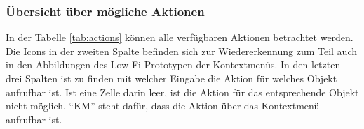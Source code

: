 \subsubsection*{Übersicht über mögliche Aktionen}

In der Tabelle \ref{tab:actions} können alle verfügbaren Aktionen betrachtet werden. Die Icons in der zweiten Spalte befinden sich zur Wiedererkennung zum Teil auch in den Abbildungen des Low-Fi Prototypen der Kontextmenüs. In den letzten drei Spalten ist zu finden mit welcher Eingabe die Aktion für welches Objekt aufrufbar ist. Ist eine Zelle darin leer, ist die Aktion für das entsprechende Objekt nicht möglich. "`KM"' steht dafür, dass die Aktion über das Kontextmenü aufrufbar ist.

\renewcommand\tabularxcolumn[1]{m{#1}}
\newcommand{\icon}[1]{\vspace{-8px}\texttt{[image: figures/icons/\#1]}}
